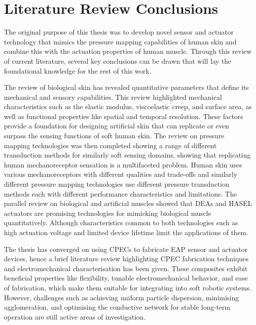 \newpage
\section{Literature Review Conclusions}
The original purpose of this thesis was to develop novel sensor and actuator technology that mimics the pressure mapping capabilities of human skin and combine this with the actuation properties of human muscle. Through this review of current literature, several key conclusions can be drawn that will lay the foundational knowledge for the rest of this work.

The review of biological skin has revealed quantitative parameters that define its mechanical and sensory capabilities. This review highlighted mechanical characteristics such as the elastic modulus, viscoelastic creep, and surface area, as well as functional properties like spatial and temporal resolution. These factors provide a foundation for designing artificial skin that can replicate or even surpass the sensing functions of soft human skin. The review on pressure mapping technologies was then completed showing a range of different transduction methods for similarly soft sensing domains, showing that replicating human mechanoreceptor sensation is a multifaceted problem. Human skin uses various mechanoreceptors with different qualities and trade-offs and similarly different pressure mapping technologies use different pressure transduction methods each with different performance characteristics and limitations. The parallel review on biological and artificial muscles showed that DEAs and HASEL actuators are promising technologies for mimicking biological muscle quantitatively. Although characteristics common to both technologies such as high actuation voltage and limited device lifetime limit the applications of them.

The thesis has converged on using CPECs to fabricate EAP sensor and actuator devices, hence a brief literature review highlighting CPEC fabrication techniques and electromechanical characterisation has been given. These composites exhibit beneficial properties like flexibility, tunable electromechanical behavior, and ease of fabrication, which make them suitable for integrating into soft robotic systems. However, challenges such as achieving uniform particle dispersion, minimising agglomeration, and optimising the conductive network for stable long-term operation are still active areas of investigation.

